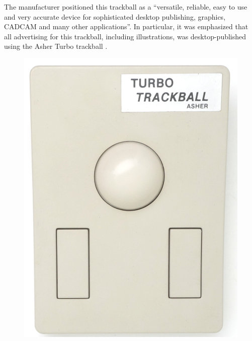 \documentclass[11pt, a4paper]{article}
\begin{document}
The manufacturer positioned this trackball as a ``versatile, reliable, easy to use and very accurate device for sophisticated desktop publishing, graphics, CADCAM and many other applications''. In particular, it was emphasized that all advertising for this trackball, including illustrations, was desktop-published using the Asher Turbo trackball \cite{turbo}.

\begin{figure}[h]
    \centering
    \includegraphics[scale=0.65]{1988_asher_turbo_trackball/top_15.jpg}

\end{figure}
\end{document}
